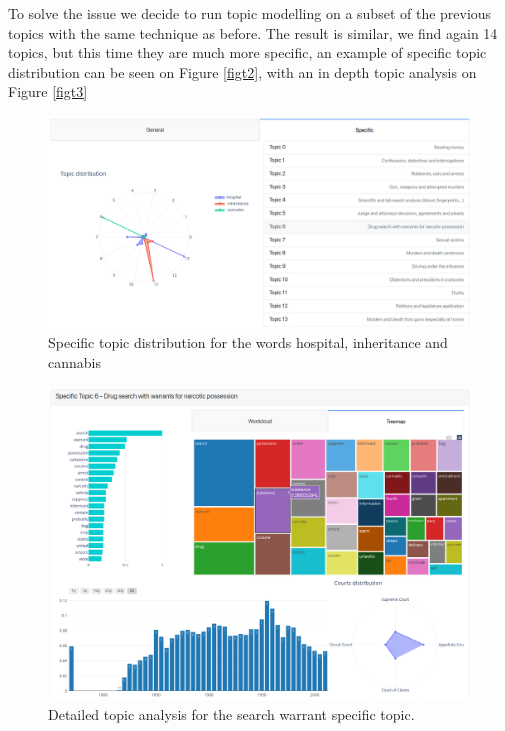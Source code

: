 To solve the issue we decide to run topic modelling on a subset of the previous 
topics with the same technique as before. The result is similar, we find again 14 topics, 
but this time they are much more specific, an example of specific topic distribution can be seen on Figure \vref{figt2}, with an in depth topic analysis on Figure \vref{figt3} 
\begin{figure}
  \begin{center}
    \includegraphics[width=\textwidth]{images/topic2.png}
    \caption{Specific topic distribution for the words hospital, inheritance and cannabis} \label{figt2}
  \end{center}
\end{figure}
\begin{figure}
  \begin{center}
    \includegraphics[width=\textwidth]{images/topic3.png}
    \caption{Detailed topic analysis for the search warrant specific topic.} \label{figt3}
  \end{center}
\end{figure}

